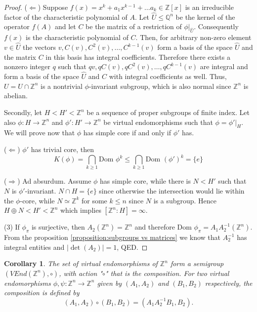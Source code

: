 \documentclass[a4paper,12pt]{amsart}
\newtheorem{corollary}{Corollary}[theorem]
\theoremstyle{definition}
\newcommand{\Dom}{\text{Dom }}
\begin{document}
\begin{proof}
		($\Leftarrow$) Suppose $f(x) = x^k + a_1 x^{k-1} + \dots a_k \in \mathbb{Z}[x]$ is an irreducible factor of the characteristic polynomial of $A$. Let $\widehat{U} \le \mathbb{Q}^n$ be the kernel of the operator $f(A)$ and let $C$ be the matrix of a restriction of $ \phi|_{\widehat{U}}$. Consequently $f(x)$ is the characteristic polynomial of $C$. Then, for arbitrary non-zero element $v \in \widehat{U}$ the vectors $v, C(v), C^2(v), \dots, C^{k-1}(v)$ form a basis of the space $\widehat{U}$ and the matrix $C$ in this basis has integral coefficients. Therefore there exists a nonzero integer $q$ such that $qv, qC(v), qC^2(v), \dots, qC^{k-1}(v)$ are integral and form a basis of the space $\widehat{U}$ and $C$ with integral coefficients as well. Thus, $U = \widehat{U} \cap \mathbb{Z}^n$ is a nontrivial $\phi$-invariant subgroup, which is also normal since $\mathbb{Z}^n$ is abelian. 
		
		Secondly, let $H < H' < \mathbb{Z}^n$ be a sequence of proper subgroups of finite index. Let also $\phi : H \rightarrow \mathbb{Z}^n$ and $\phi' : H' \rightarrow \mathbb{Z}^n$ be virtual endomorphisms such that $\phi = \phi'|_H$. We will prove now that $\phi$ has simple core if and only if $\phi'$ has. 
	
		($\Leftarrow$) $\phi'$ has trivial core, then 
		$$
		K(\phi) = \bigcap_{k \ge 1} \Dom \phi^k \le \bigcap_{k \ge 1} \Dom (\phi')^k = \{e\}
		$$ 
		
		($\Rightarrow$) Ad absurdum. Assume $\phi$ has simple core, while there is $N < H'$ such that $N$ is $\phi'$-invariant. $N \cap H = \{e\}$ since otherwise the intersection would lie within the $\phi$-core, while $N \simeq \mathbb{Z}^k$ for some $k \le n$ since $N$ is a subgroup. Hence $H \oplus N < H' < \mathbb{Z}^n$ which implies $[\mathbb{Z}^n : H] = \infty$.
		
		
		(3) If $\phi_\pi$ is surjective, then $A_2(\mathbb{Z}^n) = \mathbb{Z}^n$ and therefore $\Dom \phi_\pi = A_1 A_2^{-1} (\mathbb{Z}^n)$. From the proposition \ref{proposition:subgroups vs matrices} we know that $A_2^{-1}$ has integral entities and $|\det(A_2)| = 1$, QED. 
	\end{proof}
	
	\begin{corollary}
		The set of virtual endomorphisms of $\mathbb{Z}^n$ form a semigroup $(VEnd(\mathbb{Z}^n), \circ)$, with action "$\circ$" that is the composition. For two virtual endomorphisms $\phi, \psi : \mathbb{Z}^n \rightarrow \mathbb{Z}^n$ given by $(A_1, A_2)$ and $(B_1, B_2)$ respectively, the composition is defined by
		$$
		(A_1, A_2) \circ (B_1, B_2) = (A_1A_2^{-1}B_1, B_2).
		$$
	\end{corollary}
\end{document}
